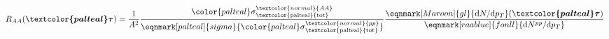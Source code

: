 \documentclass[aspectratio=169,11pt,usenames,dvipsnames]{beamer}
\begin{document}
\begin{frame}
\begin{columns}[onlytextwidth,t]
\begin{center}
        \vspace{-10pt}
        \renewcommand{\eqnhighlightheight}{\vphantom{\mathcal{D}_\mu}\mathstrut}
        \begin{equation*}
            \hspace{0pt}
            R_{AA}(\boldsymbol{\textcolor{palteal}\tau})=\dfrac{1}{A^2}\dfrac{{\color{palteal}\sigma}^{\textcolor{normal}{AA}}_{\mathrm{\textcolor{palteal}{tot}}}}{\eqnmark[palteal]{sigma}{{\color{palteal}\sigma}^{\textcolor{normal}{pp}}_{\mathrm{\textcolor{palteal}{tot}}}}}\dfrac{\eqnmark[Maroon]{gl}{\mathrm{d}N/\mathrm{d}p_T}(\boldsymbol{\textcolor{palteal}\tau})}{\eqnmark[raablue]{fonll}{\mathrm{d}N^{pp}/\mathrm{d}p_T}}
        \end{equation*}


\end{center}
\end{columns}
\end{frame}
\end{document}
